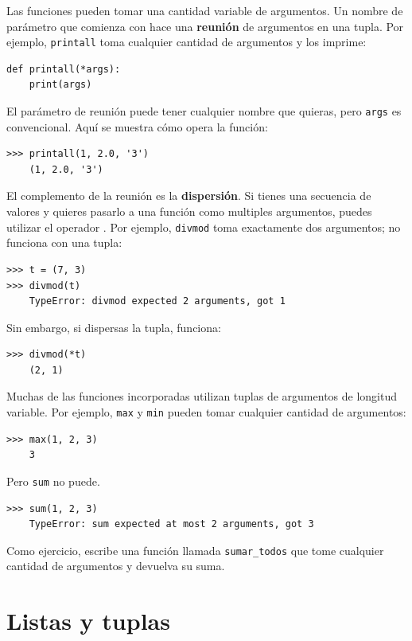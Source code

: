 \documentclass[10pt]{book}
\begin{document}
Las funciones pueden tomar una cantidad variable de argumentos.  Un nombre de parámetro
que comienza con {\tt *} hace una {\bf reunión} de argumentos en
una tupla.  Por ejemplo, {\tt printall}
toma cualquier cantidad de argumentos y los imprime:

\begin{verbatim}
def printall(*args):
    print(args)
\end{verbatim}
%
El parámetro de reunión puede tener cualquier nombre que quieras, pero {\tt args} es
convencional.  Aquí se muestra cómo opera la función:

\begin{verbatim}
>>> printall(1, 2.0, '3')
    (1, 2.0, '3')
\end{verbatim}
%
El complemento de la reunión es la {\bf dispersión}.  Si tienes una
secuencia de valores y quieres pasarlo a una función
como multiples argumentos, puedes utilizar el operador {\tt *}.
Por ejemplo, {\tt divmod} toma exactamente dos argumentos;
no funciona con una tupla:

\begin{verbatim}
>>> t = (7, 3)
>>> divmod(t)
    TypeError: divmod expected 2 arguments, got 1
\end{verbatim}
%
Sin embargo, si dispersas la tupla, funciona:

\begin{verbatim}
>>> divmod(*t)
    (2, 1)
\end{verbatim}
%
Muchas de las funciones incorporadas utilizan
tuplas de argumentos de longitud variable.  Por ejemplo, {\tt max}
y {\tt min} pueden tomar cualquier cantidad de argumentos:

\begin{verbatim}
>>> max(1, 2, 3)
    3
\end{verbatim}
%
Pero {\tt sum} no puede.

\begin{verbatim}
>>> sum(1, 2, 3)
    TypeError: sum expected at most 2 arguments, got 3
\end{verbatim}
%
Como ejercicio, escribe una función llamada \verb"sumar_todos" que tome cualquier cantidad
de argumentos y devuelva su suma.


\section{Listas y tuplas}
\end{document}
